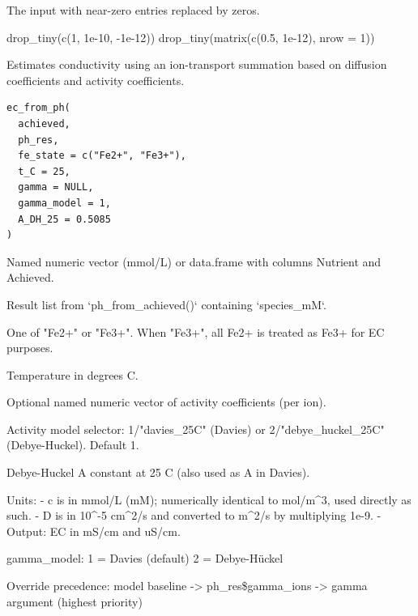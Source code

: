 \documentclass[a4paper]{book}
\begin{document}
%
\begin{Value}
The input with near-zero entries replaced by zeros.
\end{Value}
%
\begin{Examples}
\begin{ExampleCode}
drop_tiny(c(1, 1e-10, -1e-12))
drop_tiny(matrix(c(0.5, 1e-12), nrow = 1))
\end{ExampleCode}
\end{Examples}
%
\begin{Description}
Estimates conductivity using an ion-transport summation based on diffusion
coefficients and activity coefficients.
\end{Description}
%
\begin{Usage}
\begin{verbatim}
ec_from_ph(
  achieved,
  ph_res,
  fe_state = c("Fe2+", "Fe3+"),
  t_C = 25,
  gamma = NULL,
  gamma_model = 1,
  A_DH_25 = 0.5085
)
\end{verbatim}
\end{Usage}
%
\begin{Arguments}
\begin{ldescription}
\item[\code{achieved}] Named numeric vector (mmol/L) or data.frame with columns
Nutrient and Achieved.

\item[\code{ph\_res}] Result list from `ph\_from\_achieved()` containing `species\_mM`.

\item[\code{fe\_state}] One of "Fe2+" or "Fe3+". When "Fe3+", all Fe2+ is treated
as Fe3+ for EC purposes.

\item[\code{t\_C}] Temperature in degrees C.

\item[\code{gamma}] Optional named numeric vector of activity coefficients (per ion).

\item[\code{gamma\_model}] Activity model selector: 1/"davies\_25C" (Davies) or 2/"debye\_huckel\_25C" (Debye-Huckel). Default 1.

\item[\code{A\_DH\_25}] Debye-Huckel A constant at 25 C (also used as A in Davies).
\end{ldescription}
\end{Arguments}
%
\begin{Details}
Units:
- c is in mmol/L (mM); numerically identical to mol/m\textasciicircum{}3, used directly as such.
- D is in 10\textasciicircum{}-5 cm\textasciicircum{}2/s and converted to m\textasciicircum{}2/s by multiplying 1e-9.
- Output: EC in mS/cm and uS/cm.

gamma\_model:
1 = Davies (default)
2 = Debye-Hückel

Override precedence:
model baseline -> ph\_res\$gamma\_ions -> gamma argument (highest priority)
\end{Details}
\end{document}
